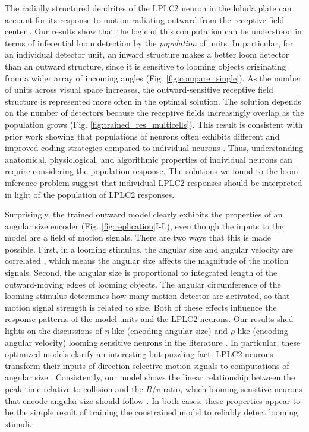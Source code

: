 \documentclass[pdftex,9pt,lineno]{elife}
\begin{document}
The radially structured dendrites of the LPLC2 neuron in the lobula plate can account for its response to motion radiating outward from the receptive field center \citep{klapoetke2017ultra}. Our results show that the logic of this computation can be understood in terms of inferential loom detection by the \textit{population} of units. In particular, for an individual detector unit, an inward structure makes a better loom detector than an outward structure, since it is sensitive to looming objects originating from a wider array of incoming angles (Fig. \ref{fig:compare_single}). As the number of units across visual space increases, the outward-sensitive receptive field structure is represented more often in the optimal solution. The solution depends on the number of detectors because the receptive fields increasingly overlap as the population grows (Fig. \ref{fig:trained_res_multicells}). This result is consistent with prior work showing that populations of neurons often exhibits different and improved coding strategies compared to individual neurons \citep{pasupathy2002population,georgopoulos1986neuronal,vogels1990population,franke2016structures,zylberberg2016direction,cafaro2020global}. Thus, understanding anatomical, physiological, and algorithmic properties of individual neurons can require considering the population response. The solutions we found to the loom inference problem suggest that individual LPLC2 responses should be interpreted in light of the population of LPLC2 responses.

Surprisingly, the trained outward model clearly exhibits the properties of an angular size encoder (Fig. \ref{fig:replication}I-L), even though the inputs to the model are a field of motion signals. There are two ways that this is made possible. First, in a looming stimulus, the angular size and angular velocity are correlated \citep{gabbiani1999computation}, which means the angular size affects the magnitude of the motion signals. Second, the angular size is proportional to integrated length of the outward-moving edges of looming objects. The angular circumference of the looming stimulus determines how many motion detector are activated, so that motion signal strength is related to size. Both of these effects influence the response patterns of the model units and the LPLC2 neurons. Our results shed lights on the discussions of $\eta$-like (encoding angular size) and $\rho$-like (encoding angular velocity) looming sensitive neurons in the literature \citep{gabbiani1999computation,wu2005tectal,liu2011neuronal,shang2015parvalbumin,temizer2015visual,dunn2016neural,von2017feature,ache2019neural}. In particular, these optimized models clarify an interesting but puzzling fact: LPLC2 neurons transform their inputs of direction-selective motion signals to computations of angular size \citep{ache2019neural}. Consistently, our model shows the linear relationship between the peak time relative to collision and the $R/v$ ratio, which looming sensitive neurons that encode angular size should follow \citep{peek2016comparative}. In both cases, these properties appear to be the simple result of training the constrained model to reliably detect looming stimuli.
\end{document}

